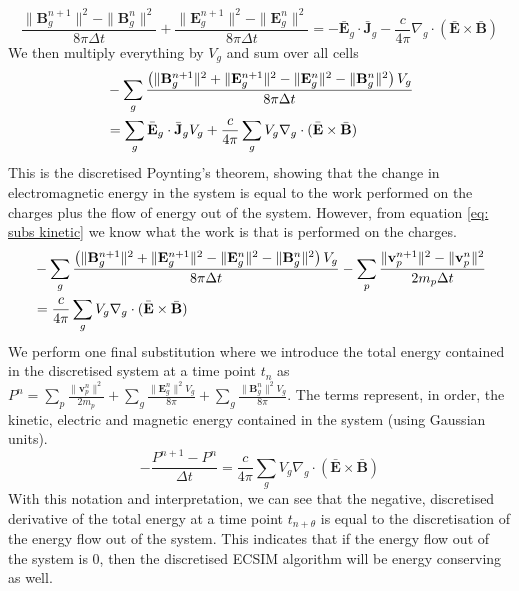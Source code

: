 \begin{equation}
        \frac{\|\mathbf{B}_g^{n+1}\|^2 - \|\mathbf{B}_g^{n}\|^2}{8 \pi \Delta t} + \frac{\|\mathbf{E}_g^{n+1}\|^2 - \|\mathbf{E}_g^{n}\|^2}{8 \pi \Delta t} = -\bar{\textbf{E}}_g \cdot \bar{\mathbf{J}}_g - \frac{c}{4\pi} \nabla_g \cdot (\bar{\textbf{E}} \times \bar{\mathbf{B}}) 
\end{equation}
We then multiply everything by $V_g$ and sum over all cells
\begin{align}
        &-\sum_g \frac{\left(\|\mathbf{B}_g^{n+1}\|^2 + \|\mathbf{E}_g^{n+1}\|^2 - \|\mathbf{E}_g^{n}\|^2 - \|\mathbf{B}_g^{n}\|^2\right) V_g}{8 \pi \Delta t} \notag \\
         &=\sum_g \bar{\textbf{E}}_g \cdot \bar{\mathbf{J}}_g V_g + \frac{c}{4\pi} \sum_g V_g \nabla_g \cdot (\bar{\textbf{E}} \times \bar{\mathbf{B}}) 
\end{align}
This is the discretised Poynting's theorem, showing that the change in electromagnetic energy in the system is equal to the work performed on the charges plus the flow of energy out of the system. However, from equation \ref{eq: subs kinetic} we know what the work is that is performed on the charges. 
\begin{align}
	&-\sum_g \frac{\left(\|\mathbf{B}_g^{n+1}\|^2 + \|\mathbf{E}_g^{n+1}\|^2 - \|\mathbf{E}_g^{n}\|^2 - \|\mathbf{B}_g^{n}\|^2\right) V_g}{8 \pi \Delta t} - \sum_p \frac{\|\textbf{v}_p^{n+1}\|^2 - \|\textbf{v}_p^{n}\|^2}{2 m_p \Delta t} \notag \\
	&= \frac{c}{4\pi} \sum_g V_g \nabla_g \cdot (\bar{\textbf{E}} \times \bar{\mathbf{B}})
\end{align}
We perform one final substitution where we introduce the total energy contained in the discretised system at a time point $t_n$ as $P^n = \sum_p \frac{\|\textbf{v}_p^{n}\|^2}{2 m_p} + \sum_g \frac{\|\mathbf{E}_g^{n}\|^2 V_g}{8 \pi} + \sum_g \frac{\|\mathbf{B}_g^{n}\|^2 V_g}{8 \pi}$. The terms represent, in order, the kinetic, electric and magnetic energy contained in the system (using Gaussian units). 
\begin{equation}
        -\frac{P^{n+1} - P^{n}}{\Delta t}= \frac{c}{4\pi} \sum_g V_g \nabla_g \cdot (\bar{\textbf{E}} \times \bar{\mathbf{B}}) 
\end{equation}
With this notation and interpretation, we can see that the negative, discretised derivative of the total energy at a time point $t_{n + \theta}$ is equal to the discretisation of the energy flow out of the system. This indicates that if the energy flow out of the system is 0, then the discretised ECSIM algorithm will be energy conserving as well.

